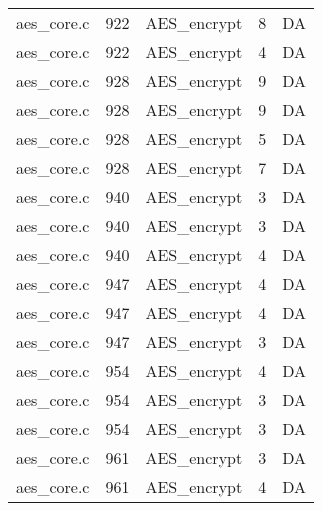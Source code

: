 \begin{table}[h]
{\begin{tabular}{clrrr}
aes\_core.c&922&AES\_encrypt&8 &DA\\
aes\_core.c&922&AES\_encrypt&4 &DA\\
aes\_core.c&928&AES\_encrypt&9 &DA\\
aes\_core.c&928&AES\_encrypt&9 &DA\\
aes\_core.c&928&AES\_encrypt&5 &DA\\
aes\_core.c&928&AES\_encrypt&7 &DA\\
aes\_core.c&940&AES\_encrypt&3 &DA\\
aes\_core.c&940&AES\_encrypt&3 &DA\\
aes\_core.c&940&AES\_encrypt&4 &DA\\
aes\_core.c&947&AES\_encrypt&4 &DA\\
aes\_core.c&947&AES\_encrypt&4 &DA\\
aes\_core.c&947&AES\_encrypt&3 &DA\\
aes\_core.c&954&AES\_encrypt&4 &DA\\
aes\_core.c&954&AES\_encrypt&3 &DA\\
aes\_core.c&954&AES\_encrypt&3 &DA\\
aes\_core.c&961&AES\_encrypt&3 &DA\\
aes\_core.c&961&AES\_encrypt&4 &DA\\
\hline
\end{tabular}
}
\end{table}
